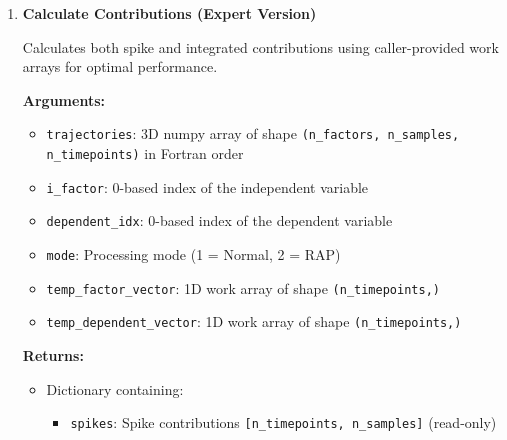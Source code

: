 \begin{enumerate}
\begin{itemize}
\begin{itemize}
                    \item \texttt{trajectory}: Integrated contributions \texttt{[n\_samples]}
                          (read-only)
                  \end{itemize}
          \end{itemize}
          \begin{lstlisting}[language=Python, caption={Contributions Calculation with Internal Allocation}]
result = tox_calc_contributions(trajectories, i_factor, 
                                dependent_idx, mode)

# Access results
spike_contribs = result['spikes']        # [n_timepoints, n_samples]
traj_contribs = result['trajectory']     # [n_samples]
          \end{lstlisting}
          
    \item \textbf{Calculate Contributions (Expert Version)}
          
          Calculates both spike and integrated contributions using caller-provided work
          arrays for optimal performance.
          
          \textbf{Arguments:}
          \begin{itemize}
            \item \texttt{trajectories}: 3D numpy array of shape \texttt{(n\_factors,
                  n\_samples, n\_timepoints)} in Fortran order
            
            \item \texttt{i\_factor}: 0-based index of the independent variable
                  
            \item \texttt{dependent\_idx}: 0-based index of the dependent variable
                  
            \item \texttt{mode}: Processing mode (1 = Normal, 2 = RAP)
                  
            \item \texttt{temp\_factor\_vector}: 1D work array of shape \texttt{(n\_timepoints,)}
                  
            \item \texttt{temp\_dependent\_vector}: 1D work array of shape \texttt{(n\_timepoints,)}
          \end{itemize}
          \textbf{Returns:}
          \begin{itemize}
            \item Dictionary containing:
                  \begin{itemize}
                    \item \texttt{spikes}: Spike contributions \texttt{[n\_timepoints, n\_samples]}
                          (read-only)
                          

\end{itemize}
\end{itemize}
\end{enumerate}
